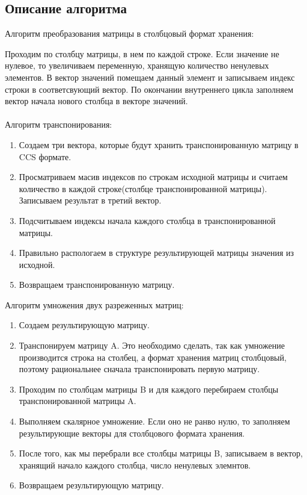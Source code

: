 \documentclass{report}
\begin{document}
\begin{center}
\section*{Описание алгоритма}
\end{center}
Алгоритм преобразования матрицы в столбцовый формат хранения:
\par Проходим по столбцу матрицы, в нем по каждой строке. Если значение не нулевое, то увеличиваем переменную, хранящую количество ненулевых элементов. В вектор значений помещаем данный элемент и записываем индекс строки в соответсвующий вектор.
По окончании внутреннего цикла заполняем вектор начала нового столбца в векторе значений.\\
\\
Алгоритм транспонирования:
\begin{enumerate}
\item Создаем три вектора, которые будут хранить транспонированную матрицу в CCS формате.
\item Просматриваем масив индексов по строкам исходной матрицы и считаем количество в каждой строке(столбце транспонированной матрицы). Записываем результат в третий вектор.
\item Подсчитываем индексы начала каждого столбца в транспонированной матрицы.
\item Правильно распологаем в структуре результирующей матрицы значения из исходной.
\item Возвращаем транспонированную матрицу.
\end{enumerate}
Алгоритм умножения двух разреженных матриц:
\begin{enumerate}
\item Создаем результирующую матрицу.
\item Транспонируем матрицу A. Это необходимо сделать, так как умножение производится строка на столбец, а формат хранения матриц столбцовый, поэтому рациональнее сначала транспонировать первую матрицу.
\item Проходим по столбцам матрицы B и для каждого перебираем столбцы транспонированной матрицы A.
\item Выполняем скалярное умножение. Если оно не ранво нулю, то заполняем результирующие векторы для столбцового формата хранения.
\item После того, как мы перебрали все столбцы матрицы B, записываем в вектор, хранящий начало каждого столбца, число ненулевых элемнтов.
\item Возвращаем результирующую матрицу.
\end{enumerate}
\newpage
\end{document}
